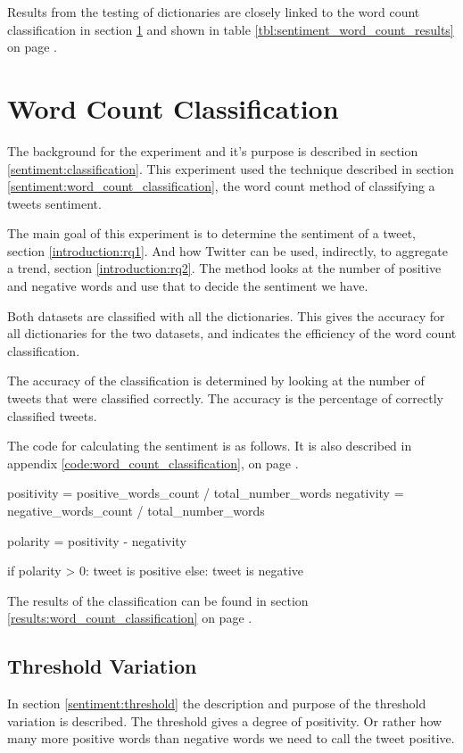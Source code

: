 Results from the testing of dictionaries are closely linked to the word count
classification in section \ref{experiments:word_count_classification} and shown in
table \ref{tbl:sentiment_word_count_results} on page
\pageref{tbl:sentiment_word_count_results}.
%

\section{Word Count Classification}\label{experiments:word_count_classification}
The background for the experiment and it's purpose is described in section
\ref{sentiment:classification}. This experiment used the technique described in
section \ref{sentiment:word_count_classification}, the word count method of
classifying a tweets sentiment.  

The main goal of this experiment is to determine the sentiment
of a tweet, section \ref{introduction:rq1}. And how Twitter can be used, indirectly, to
aggregate a trend, section \ref{introduction:rq2}.
The method looks at the number of positive and negative words and use
that to decide the sentiment we have.

Both datasets are classified with all the dictionaries. This
gives the accuracy for all dictionaries for the two datasets, and indicates the
efficiency of the word count classification. 

The accuracy of the classification is determined by looking at the number of
tweets that were classified correctly. The accuracy is the percentage of
correctly classified tweets.  

The code for calculating the sentiment is as follows. It is also described in
appendix \ref{code:word_count_classification}, on page
\pageref{code:word_count_classification}.
\begin{python}
positivity = positive_words_count / total_number_words
negativity = negative_words_count / total_number_words

polarity = positivity - negativity

if polarity > 0:
    tweet is positive
else:
    tweet is negative
\end{python}

The results of the classification can be found in section
\ref{results:word_count_classification} on page
\pageref{results:word_count_classification}.
%

\subsection{Threshold Variation}\label{experiments:threshold}
In section \ref{sentiment:threshold} the description and purpose of the
threshold variation is described. The threshold gives a degree of positivity. Or
rather how many more positive words than negative words we need to call the
tweet positive.  

